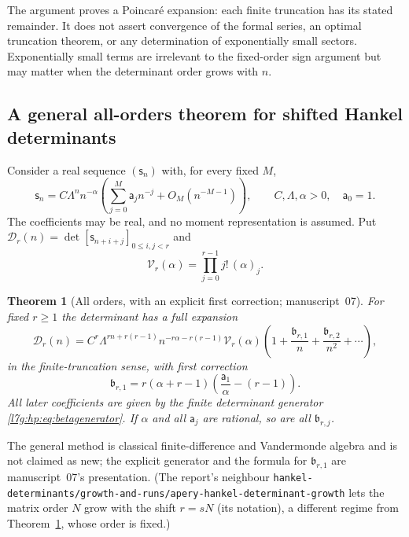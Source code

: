 \documentclass[11pt,letterpaper]{article}
\newcommand{\file}[1]{\nolinkurl{#1}}
\newtheorem{theorem}{Theorem}[section]
\theoremstyle{remark}\newtheorem{remark}[theorem]{Remark}
\newcounter{l7gtrsavedeq}
\begin{document}
The argument proves a Poincar\'e expansion: each finite truncation has its
stated remainder. It does not assert convergence of the formal series, an
optimal truncation theorem, or any determination of exponentially small
sectors. Exponentially small terms are irrelevant to the fixed-order sign
argument but may matter when the determinant order grows with $n$.

\subsection{A general all-orders theorem for shifted Hankel determinants}\label{l7g:hp:sec:general}
Consider a real sequence $(\mathsf s_n)$ with, for every fixed $M$,
\begin{equation}\label{l7g:hp:eq:generalhyp}
 \mathsf s_n=C\Lambda^nn^{-\alpha}
 \left(\sum_{j=0}^{M}\mathsf a_jn^{-j}+O_M(n^{-M-1})\right),
 \qquad C,\Lambda,\alpha>0,\quad \mathsf a_0=1.
\end{equation}
The coefficients may be real, and no moment representation is assumed.
Put $\mathcal D_r(n)=\det[\mathsf s_{n+i+j}]_{0\le i,j<r}$ and
\begin{equation}\label{l7g:hp:eq:halpha}
 \mathcal V_r(\alpha)=\prod_{j=0}^{r-1}j!\,(\alpha)_j.
\end{equation}

\begin{theorem}[All orders, with an explicit first correction; manuscript~07]\label{l7g:hp:thm:general}
For fixed $r\ge1$ the determinant has a full expansion
\begin{equation}\label{l7g:hp:eq:generalD}
 \mathcal D_r(n)=C^r\Lambda^{rn+r(r-1)}n^{-r\alpha-r(r-1)}\mathcal V_r(\alpha)
 \left(1+\frac{\mathfrak b_{r,1}}n+\frac{\mathfrak b_{r,2}}{n^2}+\cdots\right),
\end{equation}
in the finite-truncation sense, with first correction
\begin{equation}\label{l7g:hp:eq:generalbeta}
 \mathfrak b_{r,1}=r(\alpha+r-1)\left(\frac{\mathsf a_1}{\alpha}-(r-1)\right).
\end{equation}
All later coefficients are given by the finite determinant generator
\eqref{l7g:hp:eq:betagenerator}. If $\alpha$ and all $\mathsf a_j$ are
rational, so are all $\mathfrak b_{r,j}$.
\end{theorem}
The general method is classical finite-difference and Vandermonde algebra
and is not claimed as new; the explicit generator and the formula for
$\mathfrak b_{r,1}$ are manuscript~07's presentation. (The report's
neighbour \file{hankel-determinants/growth-and-runs/apery-hankel-determinant-growth}
lets the matrix order $N$ grow with the shift $r=sN$ (its notation), a
different regime from Theorem~\ref{l7g:hp:thm:general}, whose order is fixed.)
\end{document}
